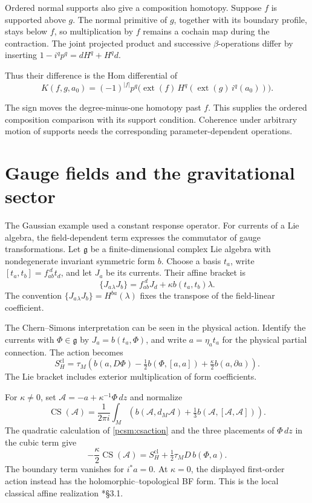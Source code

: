 Ordered normal supports also give a composition homotopy.
Suppose \(f\) is supported above \(g\).
The normal primitive of \(g\), together with its boundary profile,
stays below \(f\), so multiplication by \(f\) remains a cochain
map during the contraction.
The joint projected product and successive \(\beta\)-operations
differ by inserting \(1-i^qp^q=dH^q+H^qd\).

Thus their difference is the Hom differential of
\[
 K(f,g,a_0)=(-1)^{|f|}p^q\bigl(
  \operatorname{ext}(f)\,
  H^q(\operatorname{ext}(g)\,i^q(a_0))\bigr).
\]

The sign moves the degree-minus-one homotopy past \(f\).
This supplies the ordered composition comparison with its support
condition. Coherence under arbitrary motion of supports needs the
corresponding parameter-dependent operations.

\section{Gauge fields and the gravitational sector}
\label{pcsm:gravity}

The Gaussian example used a constant response operator.
For currents of a Lie algebra, the field-dependent term expresses
the commutator of gauge transformations.
Let \(\mathfrak g\) be a finite-dimensional complex Lie algebra
with nondegenerate invariant symmetric form \(b\).
Choose a basis \(t_a\), write
\([t_a,t_b]=f_{ab}^{\ d}t_d\), and let \(J_a\) be its currents.
Their affine bracket is
\[
 \{J_a{}_{\lambda}J_b\}=f_{ab}^{\ d}J_d
                              +\kappa b(t_a,t_b)\lambda.
\]
The convention \(\{J_a{}_{\lambda}J_b\}=H^{ba}(\lambda)\)
fixes the transpose of the field-linear coefficient.

The Chern--Simons interpretation can be seen in the physical action.
Identify the currents with \(\Phi\in\mathfrak g\) by
\(J_a=b(t_a,\Phi)\), and write \(a=\eta_a t_a\) for the
physical partial connection. The action becomes
\[
 S^{\mathrm{cl}}_H=
 \tau_M\left(b(a,D\Phi)-\tfrac12b(\Phi,[a,a])
                              +\tfrac\kappa2b(a,\partial a)\right).
\]
The Lie bracket includes exterior multiplication of form coefficients.

For \(\kappa\ne0\), set
\(\mathscr A=-a+\kappa^{-1}\Phi\,dz\) and normalize
\[
 \operatorname{CS}(\mathscr A)=\frac1{2\pi i}\int_M
 \left(b(\mathscr A,d_M\mathscr A)
                +\tfrac13b(\mathscr A,[\mathscr A,\mathscr A])\right).
\]
The quadratic calculation of \eqref{pcsm:csaction} and the three
placements of \(\Phi\,dz\) in the cubic term give
\[
 -\frac\kappa2\operatorname{CS}(\mathscr A)
       =S^{\mathrm{cl}}_H+\tfrac12\tau_M D\,b(\Phi,a).
\]
The boundary term vanishes for \(i^*a=0\).
At \(\kappa=0\), the displayed first-order action instead has
the holomorphic--topological BF form.
This is the local classical affine realization
\cite{pcsm:KZ}*{\S3.1}.


